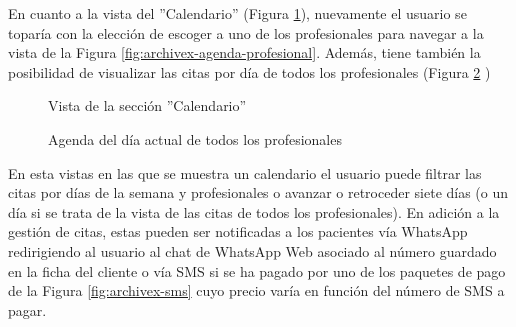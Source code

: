 En cuanto a la vista del ''Calendario'' (Figura \ref{fig:archivex-calendario}), nuevamente el usuario se toparía con la elección de escoger a uno de los profesionales para navegar a la vista de la Figura \ref{fig:archivex-agenda-profesional}. Además, tiene también la posibilidad de visualizar las citas por día de todos los profesionales (Figura \ref{fig:archivex-agenda-todos}  )

\begin{figure}[H]
    \caption{Vista de la sección ''Calendario''}
    \label{fig:archivex-calendario}
\end{figure}

\begin{figure}[H]
    \caption{Agenda del día actual de todos los profesionales}
    \label{fig:archivex-agenda-todos}
\end{figure}

En esta vistas en las que se muestra un calendario el usuario puede filtrar las citas por días de la semana y profesionales o avanzar o retroceder siete días (o un día si se trata de la vista de las citas de todos los profesionales). En adición a la gestión de citas, estas pueden ser notificadas a los pacientes vía WhatsApp redirigiendo al usuario al chat de WhatsApp Web asociado al número guardado en la ficha del cliente o vía SMS si se ha pagado por uno de los paquetes de pago de la Figura \ref{fig:archivex-sms} cuyo precio varía en función del número de SMS a pagar. \bigskip

